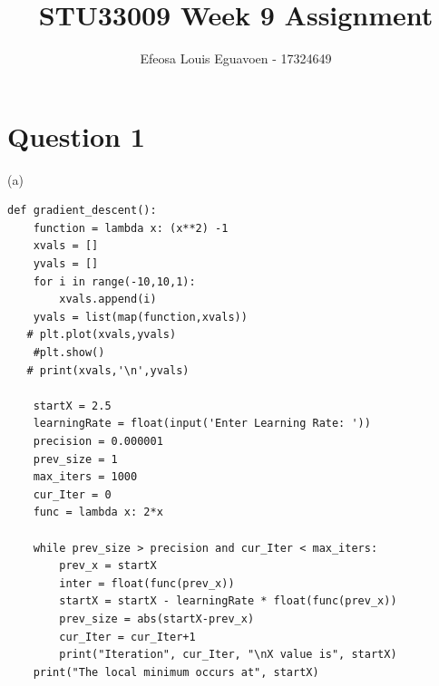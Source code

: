\documentclass[11pt]{article} %
\title{STU33009 Week 9 Assignment}
\author{Efeosa Louis Eguavoen -  17324649}
\begin{document}
\maketitle

\section{Question 1}
(a)
\begin{verbatim}
def gradient_descent():
    function = lambda x: (x**2) -1
    xvals = []
    yvals = []
    for i in range(-10,10,1):
        xvals.append(i)
    yvals = list(map(function,xvals))
   # plt.plot(xvals,yvals)
    #plt.show()
   # print(xvals,'\n',yvals)

    startX = 2.5
    learningRate = float(input('Enter Learning Rate: '))
    precision = 0.000001
    prev_size = 1
    max_iters = 1000
    cur_Iter = 0
    func = lambda x: 2*x

    while prev_size > precision and cur_Iter < max_iters:
        prev_x = startX
        inter = float(func(prev_x))
        startX = startX - learningRate * float(func(prev_x))
        prev_size = abs(startX-prev_x)
        cur_Iter = cur_Iter+1
        print("Iteration", cur_Iter, "\nX value is", startX)
    print("The local minimum occurs at", startX)
\end{verbatim}
\end{document}
